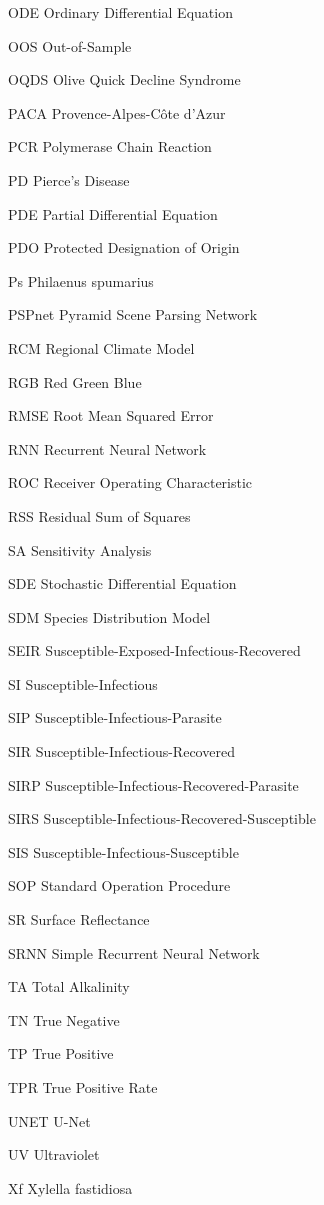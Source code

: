 \begin{abbreviations}
    \item[ODE] Ordinary Differential Equation
    \item[OOS] Out-of-Sample
    \item[OQDS] Olive Quick Decline Syndrome
    \item[PACA] Provence-Alpes-Côte d'Azur
    \item[PCR] Polymerase Chain Reaction
    \item[PD] Pierce's Disease
    \item[PDE] Partial Differential Equation
    \item[PDO] Protected Designation of Origin
    \item[Ps] Philaenus spumarius
    \item[PSPnet] Pyramid Scene Parsing Network
    \item[RCM] Regional Climate Model
    \item[RGB] Red Green Blue
    \item[RMSE] Root Mean Squared Error
    \item[RNN] Recurrent Neural Network
    \item[ROC] Receiver Operating Characteristic
    \item[RSS] Residual Sum of Squares
    \item[SA] Sensitivity Analysis
    \item[SDE] Stochastic Differential Equation
    \item[SDM] Species Distribution Model
    \item[SEIR] Susceptible-Exposed-Infectious-Recovered
    \item[SI] Susceptible-Infectious
    \item[SIP] Susceptible-Infectious-Parasite
    \item[SIR] Susceptible-Infectious-Recovered
    \item[SIRP] Susceptible-Infectious-Recovered-Parasite
    \item[SIRS] Susceptible-Infectious-Recovered-Susceptible
    \item[SIS] Susceptible-Infectious-Susceptible
    \item[SOP] Standard Operation Procedure
    \item[SR] Surface Reflectance
    \item[SRNN] Simple Recurrent Neural Network
    \item[TA] Total Alkalinity
    \item[TN] True Negative
    \item[TP] True Positive
    \item[TPR] True Positive Rate
    \item[UNET] U-Net
    \item[UV] Ultraviolet
    \item[Xf] Xylella fastidiosa

\end{abbreviations}